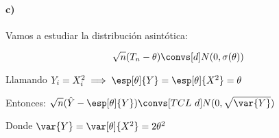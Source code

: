 \begin{problem}[2]
\paragraph{c)} Vamos a estudiar la distribución asintótica:

\[\sqrt{n}(T_n-\theta) \convs[d] N(0,\sigma(\theta))\]

Llamando $Y_i = X_i^2 \implies \esp[\theta]{Y} = \esp[\theta]{X^2} = \theta$

Entonces: $\displaystyle \sqrt{n}(\hat{Y} - \esp[\theta]{Y}) \convs[TCL \ d] N(0,\sqrt{\var{Y}})$

Donde $\var{Y} = \var[\theta]{X^2} = 2\theta^2$

\end{problem}